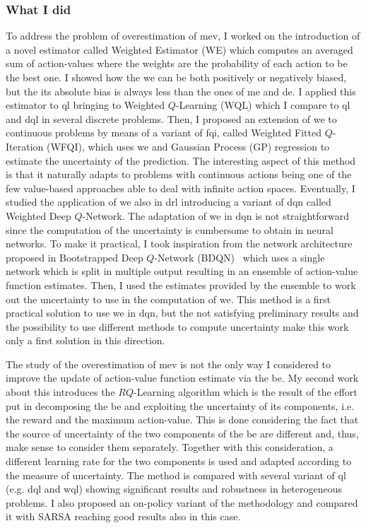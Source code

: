 \subsubsection{What I did}
To address the problem of overestimation of \gls{mev}, I worked on the introduction of a novel estimator called Weighted Estimator (WE) which computes an averaged sum of action-values where the weights are the probability of each action to be the best one. I showed how the \gls{we} can be both positively or negatively biased, but the its absolute bias is always less than the ones of \gls{me} and \gls{de}. I applied this estimator to \gls{ql} bringing to Weighted $Q$-Learning (WQL) which I compare to \gls{ql} and \gls{dql} in several discrete problems. Then, I proposed an extension of \gls{we} to continuous problems by means of a variant of \gls{fqi}, called Weighted Fitted $Q$-Iteration (WFQI), which uses \gls{we} and Gaussian Process (GP) regression to estimate the uncertainty of the prediction. The interesting aspect of this method is that it naturally adapts to problems with continuous actions being one of the few value-based approaches able to deal with infinite action spaces. Eventually, I studied the application of \gls{we} also in \gls{drl} introducing a variant of \gls{dqn} called Weighted Deep $Q$-Network. The adaptation of \gls{we} in \gls{dqn} is not straightforward since the computation of the uncertainty is cumbersome to obtain in neural networks. To make it practical, I took inspiration from the network architecture proposed in Bootstrapped Deep $Q$-Network (BDQN)~\cite{osband2017deep} which uses a single network which is split in multiple output resulting in an ensemble of action-value function estimates. Then, I used the estimates provided by the ensemble to work out the uncertainty to use in the computation of \gls{we}. This method is a first practical solution to use \gls{we} in \gls{dqn}, but the not satisfying preliminary results and the possibility to use different methods to compute uncertainty make this work only a first solution in this direction.

The study of the overestimation of \gls{mev} is not the only way I considered to improve the update of action-value function estimate via the \gls{be}. My second work about this introduces the $RQ$-Learning algorithm which is the result of the effort put in decomposing the \gls{be} and exploiting the uncertainty of its components, i.e. the reward and the maximum action-value. This is done considering the fact that the source of uncertainty of the two components of the \gls{be} are different and, thus, make sense to consider them separately. Together with this consideration, a different learning rate for the two components is used and adapted according to the measure of uncertainty. The method is compared with several variant of \gls{ql} (e.g. \gls{dql} and \gls{wql}) showing significant results and robustness in heterogeneous problems. I also proposed an on-policy variant of the methodology and compared it with SARSA reaching good results also in this case.

